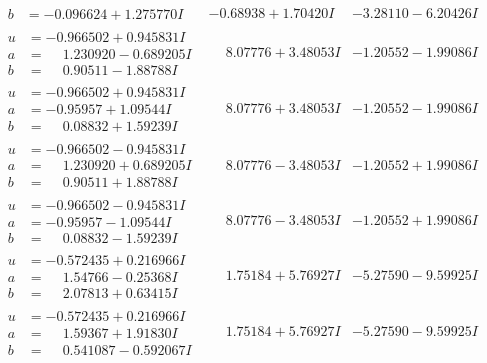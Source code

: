 \documentclass[1p]{elsarticle_modified}
\theoremstyle{definition}
\begin{document}
$$\begin{array}{c|c|c}
\begin{aligned}
b &= -0.096624 + 1.275770 I\end{aligned}
 & -0.68938 + 1.70420 I & -3.28110 - 6.20426 I \\ \hline\begin{aligned}
u &= -0.966502 + 0.945831 I \\
a &= \phantom{-}1.230920 - 0.689205 I \\
b &= \phantom{-}0.90511 - 1.88788 I\end{aligned}
 & \phantom{-}8.07776 + 3.48053 I & -1.20552 - 1.99086 I \\ \hline\begin{aligned}
u &= -0.966502 + 0.945831 I \\
a &= -0.95957 + 1.09544 I \\
b &= \phantom{-}0.08832 + 1.59239 I\end{aligned}
 & \phantom{-}8.07776 + 3.48053 I & -1.20552 - 1.99086 I \\ \hline\begin{aligned}
u &= -0.966502 - 0.945831 I \\
a &= \phantom{-}1.230920 + 0.689205 I \\
b &= \phantom{-}0.90511 + 1.88788 I\end{aligned}
 & \phantom{-}8.07776 - 3.48053 I & -1.20552 + 1.99086 I \\ \hline\begin{aligned}
u &= -0.966502 - 0.945831 I \\
a &= -0.95957 - 1.09544 I \\
b &= \phantom{-}0.08832 - 1.59239 I\end{aligned}
 & \phantom{-}8.07776 - 3.48053 I & -1.20552 + 1.99086 I \\ \hline\begin{aligned}
u &= -0.572435 + 0.216966 I \\
a &= \phantom{-}1.54766 - 0.25368 I \\
b &= \phantom{-}2.07813 + 0.63415 I\end{aligned}
 & \phantom{-}1.75184 + 5.76927 I & -5.27590 - 9.59925 I \\ \hline\begin{aligned}
u &= -0.572435 + 0.216966 I \\
a &= \phantom{-}1.59367 + 1.91830 I \\
b &= \phantom{-}0.541087 - 0.592067 I\end{aligned}
 & \phantom{-}1.75184 + 5.76927 I & -5.27590 - 9.59925 I \\ \hline\begin{aligned}

\end{aligned}
\end{array}$$
\end{document}
